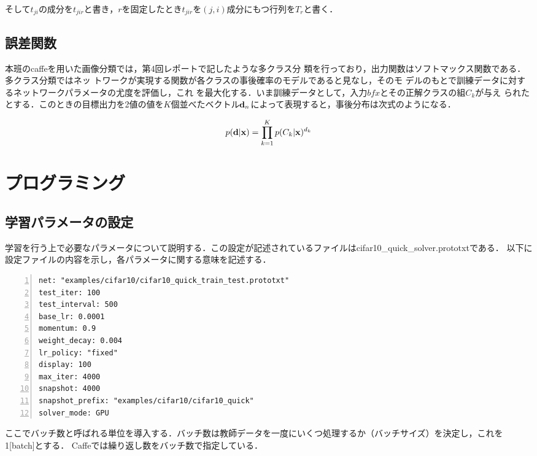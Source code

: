 \documentclass[a4paper,10pt]{jsarticle}
\begin{document}
そして$t_{ji}$の成分を$t_{jir}$と書き，$r$を固定したとき$t_{jir}$を$(j,i)$成分にもつ行列を$T_r$と書く．

\subsection{誤差関数}
本班のcaffeを用いた画像分類では，第4回レポートで記したような多クラス分
類を行っており，出力関数はソフトマックス関数である．多クラス分類ではネッ
トワークが実現する関数が各クラスの事後確率のモデルであると見なし，そのモ
デルのもとで訓練データに対するネットワークパラメータの尤度を評価し，これ
を最大化する．いま訓練データとして，入力${bf x}$とその正解クラスの組$C_k$が与え
られたとする．このときの目標出力を2値の値を$K$個並べたベクトル${\bf
d}_n$によって表現すると，事後分布は次式のようになる．

\begin{equation}
 p({\bf d}|{\bf x}) = \prod_{k=1}^{K}p(C_k|{\bf x})^{d_k}
\end{equation}



\section{プログラミング}
\subsection{学習パラメータの設定}
学習を行う上で必要なパラメータについて説明する．この設定が記述されているファイルはcifar10\_quick\_solver.prototxtである．
以下に設定ファイルの内容を示し，各パラメータに関する意味を記述する．

\begin{lstlisting}[basicstyle=\ttfamily\footnotesize, frame=single, firstnumber=1, numbers=left, breaklines=true]
net: "examples/cifar10/cifar10_quick_train_test.prototxt"
test_iter: 100
test_interval: 500
base_lr: 0.0001
momentum: 0.9
weight_decay: 0.004
lr_policy: "fixed"
display: 100
max_iter: 4000
snapshot: 4000
snapshot_prefix: "examples/cifar10/cifar10_quick"
solver_mode: GPU
\end{lstlisting}

ここでバッチ数と呼ばれる単位を導入する．バッチ数は教師データを一度にいくつ処理するか（バッチサイズ）を決定し，これを1[batch]とする．
Caffeでは繰り返し数をバッチ数で指定している．
\end{document}
